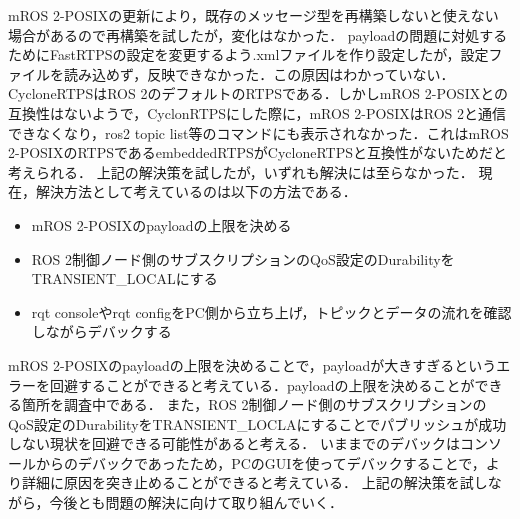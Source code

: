 mROS 2-POSIXの更新により，既存のメッセージ型を再構築しないと使えない場合があるので再構築を試したが，変化はなかった．
payloadの問題に対処するためにFastRTPSの設定を変更するよう.xmlファイルを作り設定したが，設定ファイルを読み込めず，反映できなかった．この原因はわかっていない．
CycloneRTPSはROS 2のデフォルトのRTPSである．しかしmROS 2-POSIXとの互換性はないようで，CyclonRTPSにした際に，mROS 2-POSIXはROS 2と通信できなくなり，ros2 topic list等のコマンドにも表示されなかった．これはmROS 2-POSIXのRTPSであるembeddedRTPSがCycloneRTPSと互換性がないためだと考えられる．
上記の解決策を試したが，いずれも解決には至らなかった．
現在，解決方法として考えているのは以下の方法である．
\begin{itemize}
    \item mROS 2-POSIXのpayloadの上限を決める
    \item ROS 2制御ノード側のサブスクリプションのQoS設定のDurabilityをTRANSIENT\_LOCALにする
    \item rqt consoleやrqt configをPC側から立ち上げ，トピックとデータの流れを確認しながらデバックする
\end{itemize}
mROS 2-POSIXのpayloadの上限を決めることで，payloadが大きすぎるというエラーを回避することができると考えている．payloadの上限を決めることができる箇所を調査中である．
また，ROS 2制御ノード側のサブスクリプションのQoS設定のDurabilityをTRANSIENT\_LOCLAにすることでパブリッシュが成功しない現状を回避できる可能性があると考える．
いままでのデバックはコンソールからのデバックであったため，PCのGUIを使ってデバックすることで，より詳細に原因を突き止めることができると考えている．
上記の解決策を試しながら，今後とも問題の解決に向けて取り組んでいく．



